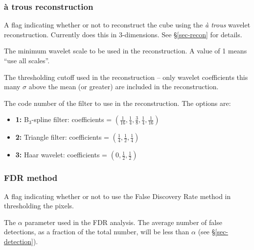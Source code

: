 \documentclass[12pt,a4paper]{article}
\newcommand{\entrylabel}[1]{\mbox{\textsf{\bf{#1:}}}\hfil}
\newenvironment{entry}
        {\begin{list}{}%
                {\renewcommand{\makelabel}{\entrylabel}%
                        \setlength{\labelwidth}{30mm}%
                        \setlength{\labelsep}{5pt}%
                        \setlength{\itemsep}{2pt}%
                        \setlength{\parsep}{2pt}%
                        \setlength{\leftmargin}{35mm}%
                }%
        }%
{\end{list}}
\begin{document}
\subsubsection*{{\` a} trous reconstruction}
\begin{entry}
\item [flagATrous {\tt [true]}] A flag indicating whether or not to
  reconstruct the cube using the {\it {\`a} trous} wavelet
  reconstruction. Currently does this in 3-dimensions. See
  \S\ref{sec-recon} for details.
\item[scaleMin {\tt [1]}] The minimum wavelet scale to be used in the
  reconstruction. A value of 1 means ``use all scales''.
\item[snrRecon {\tt [4]}] The thresholding cutoff used in the
  reconstruction -- only wavelet coefficients this many $\sigma$ above
  the mean (or greater) are included in the reconstruction. 
\item[filterCode {\tt [2]}] The code number of the filter to use in
  the reconstruction. The options are:
  \begin{itemize}
  \item {\bf 1:} B$_3$-spline filter: coefficients = 
    $(\frac{1}{16}, \frac{1}{4}, \frac{3}{8}, \frac{1}{4}, \frac{1}{16})$
  \item {\bf 2:} Triangle filter: coefficients = $(\frac{1}{4}, \frac{1}{2}, \frac{1}{4})$
  \item {\bf 3:} Haar wavelet: coefficients = $(0, \frac{1}{2}, \frac{1}{2})$
  \end{itemize}
\end{entry}

\subsubsection*{FDR method}
\begin{entry}
\item[flagFDR {\tt [false]}] A flag indicating whether or not to use
  the False Discovery Rate method in thresholding the pixels.
\item[alphaFDR {\tt [0.01]}] The $\alpha$ parameter used in the FDR
analysis. The average number of false detections, as a fraction of the
total number, will be less than $\alpha$ (see \S\ref{sec-detection}).
\end{entry}
\end{document}

